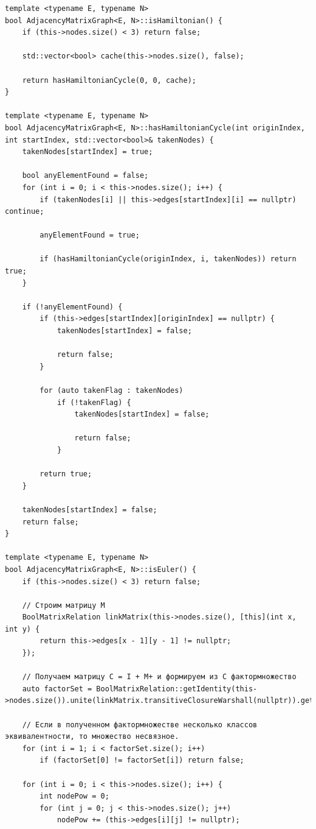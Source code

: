 \documentclass[a4paper,14pt]{extarticle}
\begin{document}
\begin{enumerate}[1.]
\begin{verbatim}
template <typename E, typename N>
bool AdjacencyMatrixGraph<E, N>::isHamiltonian() {
    if (this->nodes.size() < 3) return false;

    std::vector<bool> cache(this->nodes.size(), false);

    return hasHamiltonianCycle(0, 0, cache);
}

template <typename E, typename N>
bool AdjacencyMatrixGraph<E, N>::hasHamiltonianCycle(int originIndex, int startIndex, std::vector<bool>& takenNodes) {
    takenNodes[startIndex] = true;

    bool anyElementFound = false;
    for (int i = 0; i < this->nodes.size(); i++) {
        if (takenNodes[i] || this->edges[startIndex][i] == nullptr) continue;

        anyElementFound = true;
        
        if (hasHamiltonianCycle(originIndex, i, takenNodes)) return true;
    }

    if (!anyElementFound) {
        if (this->edges[startIndex][originIndex] == nullptr) {
            takenNodes[startIndex] = false;

            return false;
        }

        for (auto takenFlag : takenNodes) 
            if (!takenFlag) {
                takenNodes[startIndex] = false;

                return false;
            }

        return true;
    }

    takenNodes[startIndex] = false;
    return false;
}

template <typename E, typename N>
bool AdjacencyMatrixGraph<E, N>::isEuler() {
    if (this->nodes.size() < 3) return false;

    // Строим матрицу M 
    BoolMatrixRelation linkMatrix(this->nodes.size(), [this](int x, int y) {
        return this->edges[x - 1][y - 1] != nullptr;
    });

    // Получаем матрицу C = I + M+ и формируем из C фактормножество
    auto factorSet = BoolMatrixRelation::getIdentity(this->nodes.size()).unite(linkMatrix.transitiveClosureWarshall(nullptr)).getPackedFactorSet();
    
    // Если в полученном фактормножестве несколько классов эквивалентности, то множество несвязное.
    for (int i = 1; i < factorSet.size(); i++) 
        if (factorSet[0] != factorSet[i]) return false;

    for (int i = 0; i < this->nodes.size(); i++) {
        int nodePow = 0;
        for (int j = 0; j < this->nodes.size(); j++) 
            nodePow += (this->edges[i][j] != nullptr);


\end{verbatim}
\end{enumerate}
\end{document}
